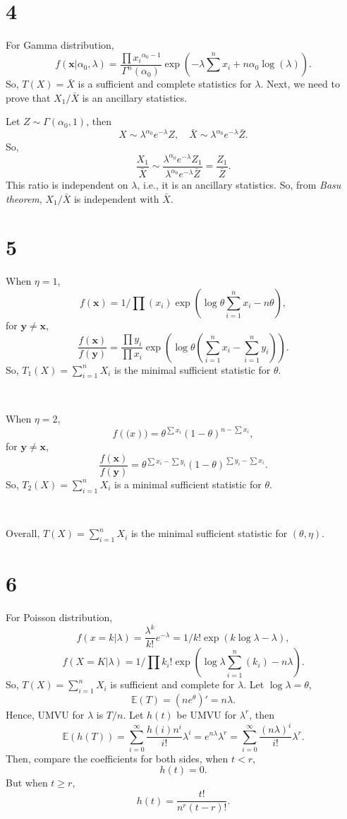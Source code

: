 \documentclass[en]{elegantpaper}
\begin{document}
    \section*{4}
    \noindent For Gamma distribution, 
    \[
        f(\mathbf{x}|\alpha_0, \lambda)=\frac{\prod{x_i}^{\alpha_0-1}}{\Gamma^n(\alpha_0)}\exp\left(-\lambda\sum^n x_i+n\alpha_0\log(\lambda)\right). 
    \]
    So, $T(X)=\bar{X}$ is a sufficient and complete statistics for $\lambda$. Next, we need to prove that $X_1/\bar{X}$ is an ancillary statistics. 

    Let $Z\sim\Gamma(\alpha_0, 1)$, then 
    \[
        X\sim\lambda^{\alpha_0}e^{-\lambda}Z, \quad \bar{X}\sim \lambda^{\alpha_0}e^{-\lambda}\bar{Z}. 
    \]
    So, 
    \[
        \frac{X_1}{\bar{X}}\sim\frac{\lambda^{\alpha_0}e^{-\lambda}Z_1}{\lambda^{\alpha_0}e^{-\lambda}\bar{Z}}=\frac{Z_1}{\bar{Z}}. 
    \]
    This ratio is independent on $\lambda$, i.e., it is an ancillary statistics. So, from \emph{Basu theorem}, $X_1/\bar{X}$ is independent with $\bar{X}$. 
    \section*{5}
    \noindent When $\eta=1$, 
    \[
        f(\mathbf{x})=1\Big/\prod(x_i)\exp\left(\log\theta\sum_{i=1}^nx_i-n\theta\right), 
    \]
    for $\mathbf{y}\neq\mathbf{x}$, 
    \[
        \frac{f(\mathbf{x})}{f(\mathbf{y})}=\frac{\prod y_i}{\prod x_i}\exp\left(\log\theta \left(\sum_{i=1}^nx_i-\sum_{i=1}^ny_i\right)\right). 
    \]
    So, $T_1(X)=\sum_{i=1}^nX_i$ is the minimal sufficient statistic for $\theta$. 
    
    \, 

    \noindent When $\eta=2$, 
    \[
        f(\mathbf(x))=\theta^{\sum x_i}(1-\theta)^{n-\sum x_i}, 
    \]
    for $\mathbf{y}\neq\mathbf{x}$, 
    \[
        \frac{f(\mathbf{x})}{f(\mathbf{y})}=\theta^{\sum x_i-\sum y_i}(1-\theta)^{\sum y_i-\sum x_i}. 
    \]
    So, $T_2(X)=\sum_{i=1}^nX_i$ is a minimal sufficient statistic for $\theta$. 

    \,

    \noindent Overall, $T(X)=\sum_{i=1}^{n}X_i$ is the minimal sufficient statistic for $(\theta, \eta)$. 
    \section*{6}
    \noindent  For Poisson distribution, 
    \[
        f(x=k|\lambda)=\frac{\lambda^k}{k!}e^{-\lambda}=1/k!\exp\left(k\log\lambda-\lambda\right), 
    \]
    \[
        f(X=K|\lambda)=1\Big/\prod k_i!\exp\left(\log\lambda\sum_{i=1}^n(k_i)-n\lambda\right). 
    \]
    So, \(T(X)=\sum_{i=1}^{n} X_{i}\) is sufficient and complete for \(\lambda\). Let $\log\lambda=\theta$, 
    \[
        \mathbb{E}(T)=\left(ne^\theta\right)'=n\lambda. 
    \]
    Hence, UMVU for $\lambda$ is $T/n$. Let $h(t)$ be UMVU for $\lambda^r$, then
    \[
        \mathbb{E}(h(T))=\sum_{i=0}^\infty\frac{h(i)n^i}{i!}\lambda^i=e^{n\lambda}\lambda^r=\sum_{i=0}^\infty\frac{(n\lambda)^i}{i!}\lambda^r. 
    \]
    Then, compare the coefficients for both sides, when $t<r$, 
    \[
        h(t)=0. 
    \]
    But when $t\geqslant r$, 
    \[
        h(t)=\frac{t!}{n^r(t-r)!}. 
    \]
\end{document}

